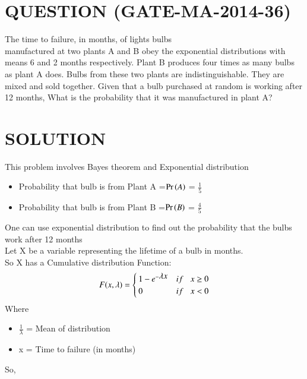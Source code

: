 \documentclass[journal,12pt,twocolumn]{IEEEtran}
\begin{document}
\section*{QUESTION (GATE-MA-2014-36)}
The time to failure, in months, of lights bulbs \\manufactured at two plants A and B
obey the exponential distributions with means 6 and 2 months respectively. Plant B produces
four times as many bulbs as plant A does. Bulbs from these two plants are indistinguishable.
They are mixed and sold together. Given that a bulb purchased at random is working after 12 months, What is the probability that it was manufactured in plant A?
\section*{SOLUTION}
This problem involves Bayes theorem and \newline Exponential distribution
\bigskip
\begin{itemize}
    \item Probability that bulb is from Plant A =\newline $\Pr\left(A\right)$ = \(\frac{1}{5}\)
    \item Probability that bulb is from Plant B =\newline$\Pr\left(B\right)$ = \( \frac{4}{5} \)
\end{itemize}
\bigskip
One can use exponential distribution to find out the probability that the bulbs work after 12 months\\
Let X be a variable representing the lifetime of a bulb in months.\\
So X has a Cumulative distribution Function:
\begin{equation}
    F(x,\lambda) =
    \begin{cases}
        1 - {e}^{-\displaystyle\lambda x} & if \hspace{0.3cm}x \geq 0 \\
        0                                 & if \hspace{0.3cm}x < 0
    \end{cases}
\end{equation}
Where
\begin{itemize}
    \item $\frac{1}{\displaystyle\lambda}$ = Mean of distribution
          \newline
    \item x = Time to failure (in months)
\end{itemize}
\bigskip
So,
\end{document}
